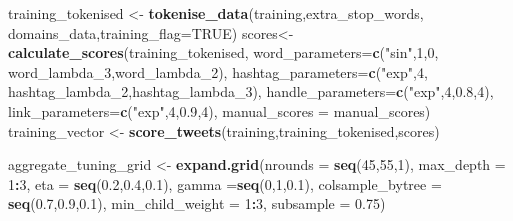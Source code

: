 \documentclass[11pt,]{article}
\newenvironment{Shaded}{\begin{snugshade}}{\end{snugshade}}
\newcommand{\DataTypeTok}[1]{\textcolor[rgb]{0.13,0.29,0.53}{#1}}
\newcommand{\DecValTok}[1]{\textcolor[rgb]{0.00,0.00,0.81}{#1}}
\newcommand{\FloatTok}[1]{\textcolor[rgb]{0.00,0.00,0.81}{#1}}
\newcommand{\KeywordTok}[1]{\textcolor[rgb]{0.13,0.29,0.53}{\textbf{#1}}}
\newcommand{\NormalTok}[1]{#1}
\newcommand{\OperatorTok}[1]{\textcolor[rgb]{0.81,0.36,0.00}{\textbf{#1}}}
\newcommand{\OtherTok}[1]{\textcolor[rgb]{0.56,0.35,0.01}{#1}}
\newcommand{\StringTok}[1]{\textcolor[rgb]{0.31,0.60,0.02}{#1}}
\begin{document}
\begin{Shaded}
\begin{Highlighting}[]
\NormalTok{training_tokenised <-}\StringTok{ }\KeywordTok{tokenise_data}\NormalTok{(training,extra_stop_words,}
\NormalTok{                                    domains_data,}\DataTypeTok{training_flag=}\OtherTok{TRUE}\NormalTok{)}
\NormalTok{scores<-}\StringTok{ }\KeywordTok{calculate_scores}\NormalTok{(training_tokenised,}
                             \DataTypeTok{word_parameters=}\KeywordTok{c}\NormalTok{(}\StringTok{"sin"}\NormalTok{,}\DecValTok{1}\NormalTok{,}\DecValTok{0}\NormalTok{,}
\NormalTok{                                               word_lambda_}\DecValTok{3}\NormalTok{,word_lambda_}\DecValTok{2}\NormalTok{),}
                             \DataTypeTok{hashtag_parameters=}\KeywordTok{c}\NormalTok{(}\StringTok{"exp"}\NormalTok{,}\DecValTok{4}\NormalTok{,}
\NormalTok{                                                  hashtag_lambda_}\DecValTok{2}\NormalTok{,hashtag_lambda_}\DecValTok{3}\NormalTok{),}
                             \DataTypeTok{handle_parameters=}\KeywordTok{c}\NormalTok{(}\StringTok{"exp"}\NormalTok{,}\DecValTok{4}\NormalTok{,}\FloatTok{0.8}\NormalTok{,}\DecValTok{4}\NormalTok{),}
                             \DataTypeTok{link_parameters=}\KeywordTok{c}\NormalTok{(}\StringTok{"exp"}\NormalTok{,}\DecValTok{4}\NormalTok{,}\FloatTok{0.9}\NormalTok{,}\DecValTok{4}\NormalTok{),}
                              \DataTypeTok{manual_scores =}\NormalTok{ manual_scores)}
\NormalTok{training_vector <-}\StringTok{ }\KeywordTok{score_tweets}\NormalTok{(training,training_tokenised,scores) }
 
\NormalTok{aggregate_tuning_grid <-}\StringTok{ }\KeywordTok{expand.grid}\NormalTok{(}\DataTypeTok{nrounds =} \KeywordTok{seq}\NormalTok{(}\DecValTok{45}\NormalTok{,}\DecValTok{55}\NormalTok{,}\DecValTok{1}\NormalTok{),  }
                                     \DataTypeTok{max_depth =} \DecValTok{1}\OperatorTok{:}\DecValTok{3}\NormalTok{,}
                                     \DataTypeTok{eta =} \KeywordTok{seq}\NormalTok{(}\FloatTok{0.2}\NormalTok{,}\FloatTok{0.4}\NormalTok{,}\FloatTok{0.1}\NormalTok{), }
                                     \DataTypeTok{gamma =}\KeywordTok{seq}\NormalTok{(}\DecValTok{0}\NormalTok{,}\DecValTok{1}\NormalTok{,}\FloatTok{0.1}\NormalTok{),}
                                     \DataTypeTok{colsample_bytree =} \KeywordTok{seq}\NormalTok{(}\FloatTok{0.7}\NormalTok{,}\FloatTok{0.9}\NormalTok{,}\FloatTok{0.1}\NormalTok{), }
                                     \DataTypeTok{min_child_weight =} \DecValTok{1}\OperatorTok{:}\DecValTok{3}\NormalTok{, }
                                     \DataTypeTok{subsample =} \FloatTok{0.75}\NormalTok{) }


\end{Highlighting}
\end{Shaded}
\end{document}
